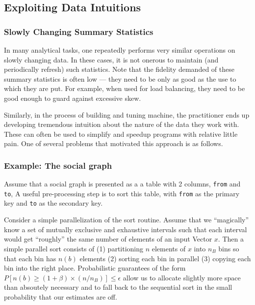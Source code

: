 \subsection{Exploiting Data Intuitions}
\subsubsection{Slowly Changing Summary Statistics}

In many analytical tasks, one repeatedly performs very similar operations on slowly
changing data. In these cases, 
it is not onerous to maintain (and periodically refresh) such statistics. 
Note that the fidelity demanded of these summary statistics is often low ---
they need to be only as good as the use to which they are put. For example, when
used for load balancing, they need to be good enough to guard against excessive
skew.

Similarly, 
in the process of building and tuning machine, the practitioner ends up
developing tremendous intuition about the nature of the data they work with.
These can often be used to simplify and speedup programs with relative little
pain. One of several problems that motivated this approach is as follows.



\subsubsection{Example: The social graph}

Assume that a social graph is presented as a 
a table with 2 columns, {\tt from} and {\tt to},
A useful pre-processing step is to sort this table, with {\tt from} as the
primary key and {\tt to} as the secondary key.

Consider a simple parallelization of the sort routine. Assume that we 
``magically'' know a set of mutually exclusive and exhaustive intervals such
that each interval would get ``roughly'' the same number of elements of an input
Vector \(x\). Then a simple parallel sort consists of 
(1) partitioning \(n\) elements of \(x\) into \(n_B\) bins so that each bin has
\(n(b)\) elements
(2) sorting each bin in parallel
(3) copying each bin into the right place. Probabilistic guarantees
of the form \(P[n(b) \geq (1+\beta) \times(n/n_B)] \leq \epsilon\) 
allow us to allocate slightly more space than absoutely necessary and to 
fall back to the sequential sort in the small probability that our estimates are off.


